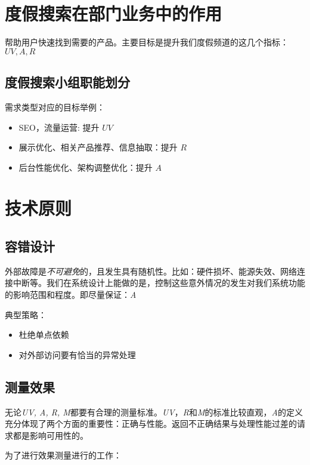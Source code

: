\documentclass{report}
\begin{document}
\begin{CJK}{UTF8}{gbsn}
\chapter{度假搜索在部门业务中的作用}

帮助用户快速找到需要的产品。主要目标是提升我们度假频道的这几个指标：$ UV, A, R $

\section{度假搜索小组职能划分}



需求类型对应的目标举例：

\begin{itemize}
  \item { SEO，流量运营: 提升 $ UV $ }
  \item { 展示优化、相关产品推荐、信息抽取：提升 $ R $ }
  \item { 后台性能优化、架构调整优化：提升 $ A $ }
\end{itemize}

\chapter{技术原则}

\section{容错设计}

外部故障是\emph{不可避免}的，且发生具有随机性。比如：硬件损坏、能源失效、网络连接中断等。我们在系统设计上能做的是，控制这些意外情况的发生对我们系统功能的影响范围和程度。即尽量保证：\emph{A}

典型策略：

\begin{itemize}
  \item { 杜绝单点依赖 }
  \item { 对外部访问要有恰当的异常处理 }
\end{itemize}

\section{测量效果}

无论\emph{UV, A, R, M}都要有合理的测量标准。\emph{UV}，\emph{R}和\emph{M}的标准比较直观，\emph{A}的定义充分体现了两个方面的重要性：正确与性能。返回不正确结果与处理性能过差的请求都是影响可用性的。

为了进行效果测量进行的工作：


\end{CJK}
\end{document}
